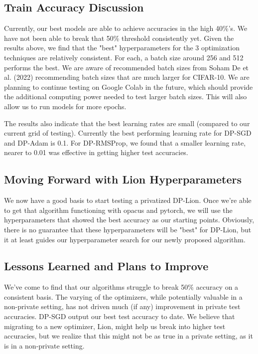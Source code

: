 \subsection{Train Accuracy Discussion}\label{subsec:train-testloss-accuracy}
Currently, our best models are able to achieve accuracies in the high 40\%'s. We have not been able to break that 50\% threshold
consistently yet. Given the results above, we find that the "best" hyperparameters for the 3 optimization techniques are relatively 
consistent. For each, a batch size around 256 and 512 performs the best. We are aware of recommended batch sizes from Soham De et al. (2022) \cite{De_2022_ScaleDP_ImageClassification}
recommending batch sizes that are much larger for CIFAR-10. We are planning to continue testing on Google Colab in the future, which should 
provide the additional computing power needed to test larger batch sizes. This will also allow us to run models for more epochs.

The results also indicate that the best learning rates are small (compared to our current grid of testing). Currently the best performing 
learning rate for DP-SGD and DP-Adam is 0.1. For DP-RMSProp, we found that a smaller learning rate, nearer to 0.01 was effective in getting 
higher test accuracies.

\subsection{Moving Forward with Lion Hyperparameters}\label{subsec:train-testloss-accuracy}
We now have a good basis to start testing a privatized DP-Lion. Once we're able to get that algorithm functioning with opacus and pytorch, we will
use the hyperparameters that showed the best accuracy as our starting points. Obviously, there is no guarantee that these hyperparameters will be "best"
for DP-Lion, but it at least guides our hyperparameter search for our newly proposed algorithm.

\subsection{Lessons Learned and Plans to Improve}\label{subsec:train-testloss-accuracy}
We've come to find that our algorithms struggle to break 50\% accuracy on a consistent basis. The varying of the optimizers, while potentially valuable
in a non-private setting, has not driven much (if any) improvement in private test accuracies. DP-SGD output our best test accuracy to date. We believe that
migrating to a new optimizer, Lion, might help us break into higher test accuracies, but we realize that this might not be as true in a private setting, as it is
in a non-private setting.

